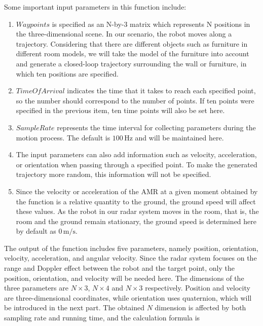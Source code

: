 \documentclass[12pt,DIV14,BCOR12mm,a4paper,footinclude=false,headinclude,parskip=half-,twoside,openright,cleardoublepage=empty,toc=index,bibliography=totoc,listof=totoc]{scrreprt}
\numberwithin{equation}{chapter}
\begin{document}
Some important input parameters in this function include:
\begin{enumerate}[label=\textbullet]
    \item $Waypoints$ is specified as an N-by-3 matrix which represents N positions in the three-dimensional scene. In our scenario, the robot moves along a trajectory. Considering that there are different objects such as furniture in different room models, we will take the model of the furniture into account and generate a closed-loop trajectory surrounding the wall or furniture, in which ten positions are specified.

    \item $TimeOfArrival$ indicates the time that it takes to reach each specified point, so the number should correspond to the number of points. If ten points were specified in the previous item, ten time points will also be set here.

    \item $SampleRate$ represents the time interval for collecting parameters during the motion process. The default is $100\,\mathrm{Hz}$ and will be maintained here.

    \item The input parameters can also add information such as velocity, acceleration, or orientation when passing through a specified point. To make the generated trajectory more random, this information will not be specified.

    \item Since the velocity or acceleration of the AMR at a given moment obtained by the function is a relative quantity to the ground, the ground speed will affect these values. As the robot in our radar system moves in the room, that is, the room and the ground remain stationary, the ground speed is determined here by default as $0\,\mathrm{m/s}$.
\end{enumerate}

The output of the function includes five parameters, namely position, orientation, velocity, acceleration, and angular velocity. Since the radar system focuses on the range and Doppler effect between the robot and the target point, only the position, orientation, and velocity will be needed here. The dimensions of the three parameters are $N\times 3$, $N\times 4$ and $N\times 3$ respectively. Position and velocity are three-dimensional coordinates, while orientation uses quaternion, which will be introduced in the next part. The obtained $N$ dimension is affected by both sampling rate and running time, and the calculation formula is
\end{document}
